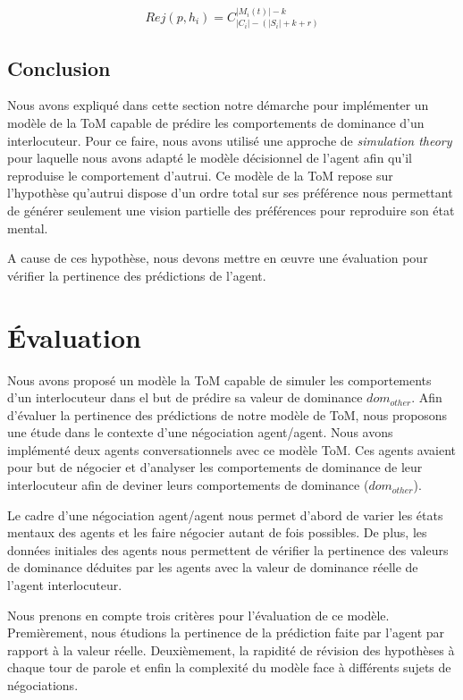 \begin{equation}
Rej(p, h_i) = C_{|C_i|-(|S_i| + k + r)}^{|M_i(t)| - k}
\end{equation}

\subsection{Conclusion}
	Nous avons expliqué dans cette section notre démarche pour implémenter un modèle de la ToM capable de prédire les comportements de dominance d'un interlocuteur. Pour ce faire, nous avons utilisé une approche de \emph{simulation theory} pour laquelle nous avons adapté le modèle décisionnel de l'agent afin qu'il reproduise le comportement d'autrui. Ce modèle de la ToM repose sur l'hypothèse qu'autrui dispose d'un ordre total sur ses préférence nous permettant de générer  seulement une vision partielle des préférences pour reproduire son état mental. 
	
	A cause de ces hypothèse, nous devons mettre en œuvre une évaluation pour vérifier la pertinence des prédictions de l'agent.

\section{Évaluation}

Nous avons proposé un modèle la ToM capable de simuler les comportements d'un interlocuteur dans el but de prédire sa valeur de dominance $dom_{other}$. Afin d'évaluer la pertinence des prédictions de notre modèle de ToM, nous proposons une étude  dans le contexte d'une négociation agent/agent. Nous avons implémenté  deux agents conversationnels avec ce modèle ToM. Ces agents avaient pour but de négocier et d'analyser les comportements de dominance de leur interlocuteur afin de deviner leurs comportements de dominance ($dom_{other}$).

Le cadre d'une négociation agent/agent nous permet d'abord de varier les états mentaux des agents et les faire négocier autant de fois possibles.
De plus, les données initiales des agents nous permettent de vérifier la pertinence des valeurs de dominance déduites par les agents avec la valeur de dominance réelle de l'agent interlocuteur. 

Nous prenons en compte trois critères pour l'évaluation de ce modèle. Premièrement, nous étudions la pertinence de la prédiction faite par l'agent par rapport à la valeur réelle. Deuxièmement, la rapidité de révision des hypothèses à chaque tour de parole et enfin la complexité du modèle face à différents sujets de négociations.

